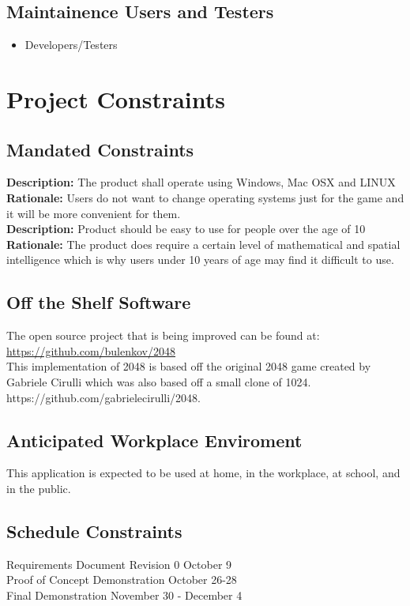 \documentclass[12pt]{article}
\begin{document}
\subsection{Maintainence Users and Testers}
\begin{itemize}
    \item Developers/Testers
\end{itemize}

\section{Project Constraints}
\subsection{Mandated Constraints}
\textbf{Description:} The product shall operate using Windows, Mac OSX and LINUX\\
\textbf{Rationale:} Users do not want to change operating systems just for the game and it will be more convenient for them.\\
\textbf{Description:} Product should be easy to use for people over the age
of 10\\
\textbf{Rationale:} The product does require a certain level of mathematical and spatial intelligence which is why users under 10 years of age may find it difficult to use.
\subsection{Off the Shelf Software}
\par\indent\indent The open source project that is being improved can be found at: \\ \url{https://github.com/bulenkov/2048}\\
This implementation of 2048 is based off the original 2048 game created by Gabriele Cirulli which was also based off a small clone of 1024. https://github.com/gabrielecirulli/2048.
\subsection{Anticipated Workplace Enviroment}
This application is expected to be used at home, in the workplace, at school, and in the public.\\
\subsection{Schedule Constraints}
Requirements Document Revision 0	\hfill	October 9 \\
Proof of Concept Demonstration \hfill		October 26-28 \\
Final Demonstration \hfill				November 30 - December 4 \\
\end{document}
